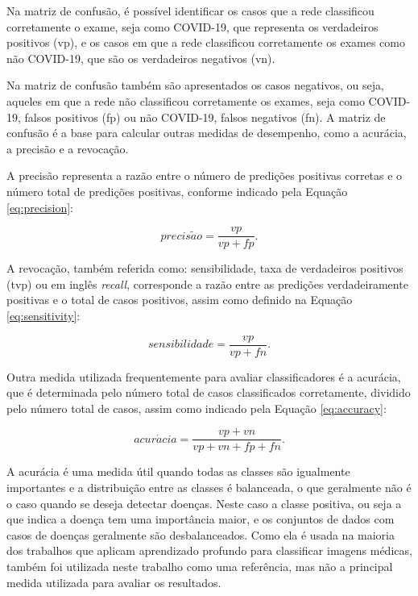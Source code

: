 Na matriz de confusão, é possível identificar os casos que a rede classificou corretamente o exame, seja como COVID-19, que representa os verdadeiros positivos (vp), e os casos em que a rede classificou corretamente os exames como não COVID-19, que são os verdadeiros negativos (vn). 

Na matriz de confusão também são apresentados os casos negativos, ou seja, aqueles em que a rede não classificou corretamente os exames, seja como COVID-19, falsos positivos (fp) ou não COVID-19, falsos negativos (fn). A matriz de confusão é a base para calcular outras medidas de desempenho, como a acurácia, a precisão e a revocação. 

A precisão representa a razão entre o número de predições positivas corretas e o número total de predições positivas, conforme indicado pela Equação \ref{eq:precision}:

\begin{equation} \label{eq:precision}
precis\tilde{a}o = \frac{vp}{vp+fp}.
\end{equation}

A revocação, também referida como: sensibilidade, taxa de verdadeiros positivos (tvp) ou em inglês \textit{recall}, corresponde a razão entre as predições verdadeiramente positivas e o total de casos positivos, assim como definido na Equação \ref{eq:sensitivity}:

\begin{equation} \label{eq:sensitivity}
sensibilidade = \frac{vp}{vp+fn}.
\end{equation}

Outra medida utilizada frequentemente para avaliar classificadores é a acurácia, que é determinada pelo número total de casos classificados corretamente, dividido pelo número total de casos, assim como indicado pela Equação \ref{eq:accuracy}:

\begin{equation} \label{eq:accuracy}
acur\acute{a}cia = \frac{vp + vn}{vp + vn + fp + fn}.
\end{equation}

A acurácia é uma medida útil quando todas as classes são igualmente importantes e a distribuição entre as classes é balanceada, o que geralmente não é o caso quando se deseja detectar doenças. Neste caso a classe positiva, ou seja a que indica a doença tem uma importância maior, e os conjuntos de dados com casos de doenças geralmente são desbalanceados. Como ela é usada na maioria dos trabalhos que aplicam aprendizado profundo para classificar imagens médicas, também foi utilizada neste trabalho como uma referência, mas não a principal medida utilizada para avaliar os resultados.

